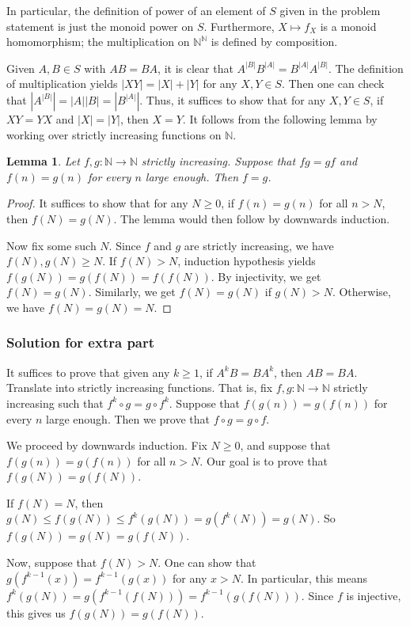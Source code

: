 \documentclass{article}
\newcommand{\N}{\mathbb{N}}
\newtheorem{lemma}{Lemma}
\begin{document}
In particular, the definition of power of an element of $S$ given in the problem statement is just the monoid power on $S$.
Furthermore, $X \mapsto f_X$ is a monoid homomorphism; the multiplication on $\N^\N$ is defined by composition.

Given $A, B \in S$ with $AB = BA$, it is clear that $A^{|B|} B^{|A|} = B^{|A|} A^{|B|}$.
The definition of multiplication yields $|XY| = |X| + |Y|$ for any $X, Y \in S$.
Then one can check that $|A^{|B|}| = |A||B| = |B^{|A|}|$.
Thus, it suffices to show that for any $X, Y \in S$, if $XY = YX$ and $|X| = |Y|$, then $X = Y$.
It follows from the following lemma by working over strictly increasing functions on $\N$.

\begin{lemma}\label{2017c7-2}
Let $f, g : \N \to \N$ strictly increasing.
Suppose that $fg = gf$ and $f(n) = g(n)$ for every $n$ large enough.
Then $f = g$.
\end{lemma}
\begin{proof}
It suffices to show that for any $N \geq 0$, if $f(n) = g(n)$ for all $n > N$, then $f(N) = g(N)$.
The lemma would then follow by downwards induction.

Now fix some such $N$.
Since $f$ and $g$ are strictly increasing, we have $f(N), g(N) \geq N$.
If $f(N) > N$, induction hypothesis yields $f(g(N)) = g(f(N)) = f(f(N))$.
By injectivity, we get $f(N) = g(N)$.
Similarly, we get $f(N) = g(N)$ if $g(N) > N$.
Otherwise, we have $f(N) = g(N) = N$.
\end{proof}



\subsubsection*{Solution for extra part}

It suffices to prove that given any $k \geq 1$, if $A^k B = B A^k$, then $AB = BA$.
Translate into strictly increasing functions.
That is, fix $f, g : \N \to \N$ strictly increasing such that $f^k \circ g = g \circ f^k$.
Suppose that $f(g(n)) = g(f(n))$ for every $n$ large enough.
Then we prove that $f \circ g = g \circ f$.

We proceed by downwards induction.
Fix $N \geq 0$, and suppose that $f(g(n)) = g(f(n))$ for all $n > N$.
Our goal is to prove that $f(g(N)) = g(f(N))$.

If $f(N) = N$, then $g(N) \leq f(g(N)) \leq f^k(g(N)) = g(f^k(N)) = g(N)$.
So $f(g(N)) = g(N) = g(f(N))$.

Now, suppose that $f(N) > N$.
One can show that $g(f^{k - 1}(x)) = f^{k - 1}(g(x))$ for any $x > N$.
In particular, this means $f^k(g(N)) = g(f^{k - 1}(f(N))) = f^{k - 1}(g(f(N)))$.
Since $f$ is injective, this gives us $f(g(N)) = g(f(N))$.
\end{document}
